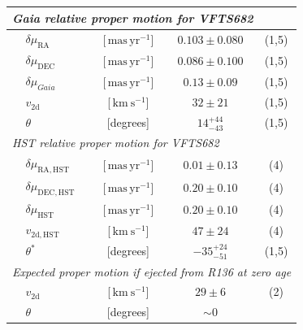 \documentclass[apjl,twocolumn]{emulateapj}
\newcommand{\SdM}[1]{{{\color{brown}{#1}}}}
\newcommand{\kms}{{\,\mathrm{km\ s^{-1}}}}
\newcommand{\masyr}{\,\mathrm{mas}\,\mathrm{yr}^{-1}}
\begin{document}
\begin{table}
\begin{center}
\begin{tabular}{llc|c|c}
                


      \multicolumn{5}{l}{\emph{Gaia relative proper motion for VFTS682 }} \\
      \hline
      &$\delta\mu_\mathrm{RA}$  &[$\masyr$] & $0.103\pm0.080$ & (1,5) \\
      &$\delta\mu_\mathrm{DEC}$  &[$\masyr$] & $0.086\pm0.100$ &  (1,5) \\
      &$\delta\mu_{Gaia}$  &[$\masyr$] & $0.13\pm0.09$ &  (1,5) \\
      &$v_\mathrm{2d}$  &[$\kms$] & $32\pm21$ & (1,5)\\  
      &$\theta$  &[degrees] &  $14_{-43}^{+44}$  & (1,5)\\  

 \hline     
      \multicolumn{5}{l}{\emph{HST relative proper motion for VFTS682}} \\
            \hline
      &$\delta\mu_\mathrm{RA, HST}$  &[$\masyr$] & $0.01\pm0.13$ & (4) \\
      &$\delta\mu_\mathrm{DEC, HST}$  &[$\masyr$] & $0.20\pm0.10$ &  (4) \\
       &$\delta\mu_\mathrm{HST}$  &[$\masyr$] & $0.20\pm0.10$ &  (4) \\
                  &$v_\mathrm{2d, HST}$  &[$\kms$] & $47\pm24$ & (4)\\  
                      &$\theta^{*}$  &[degrees] &   $-35_{-51}^{+24}$   & (1,5)\\  
    \hline
       \multicolumn{5}{l}{\emph{Expected proper motion if ejected from R136 at zero age}} \\
      \hline
      &$v_\mathrm{2d}$  &[$\kms$] & $29\pm 6$ & (2) \\  
      &$\theta$  &[degrees] &  $\sim0$  & \\ 
       \hline

     
\hline


      \hline


\end{tabular}
\end{center}
\end{table}
\end{document}
